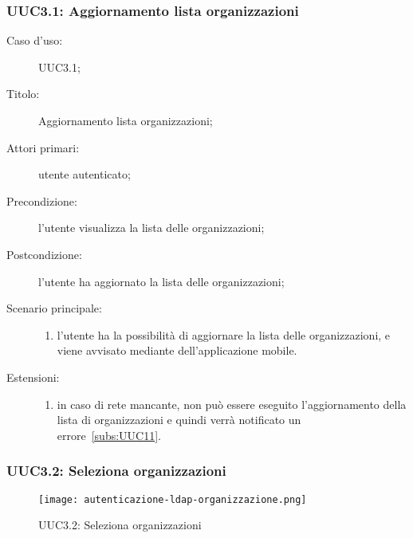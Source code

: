 \documentclass[../../../analisi-dei-requisiti.tex]{subfiles}
\begin{document}
\subsubsection{UUC3.1: Aggiornamento lista organizzazioni}%
\label{subs:UUC3.1}
\begin{description}
  \item[Caso d’uso:] UUC3.1;
  \item[Titolo:] Aggiornamento lista organizzazioni;
  \item[Attori primari:] utente autenticato;
  \item[Precondizione:] l'utente visualizza la lista delle organizzazioni;
  \item[Postcondizione:] l'utente ha aggiornato la lista delle organizzazioni;
  \item[Scenario principale:]
        \begin{enumerate}
          \item l'utente ha la possibilità di aggiornare la lista delle organizzazioni, e viene avvisato mediante  dell'applicazione mobile.
        \end{enumerate}
  \item[Estensioni:]
        \begin{enumerate}
          \item in caso di rete mancante, non può essere eseguito l'aggiornamento della lista di organizzazioni e quindi verrà notificato un errore~\ref{subs:UUC11}.
        \end{enumerate}
\end{description}


\subsubsection{UUC3.2: Seleziona organizzazioni}%
\label{subs:UUC3.2}

\begin{figure}[H]
  \centering
  \texttt{[image: autenticazione-ldap-organizzazione.png]}
  \caption{UUC3.2: Seleziona organizzazioni}%
  \label{fig:UUC3.2}
\end{figure}
\end{document}
